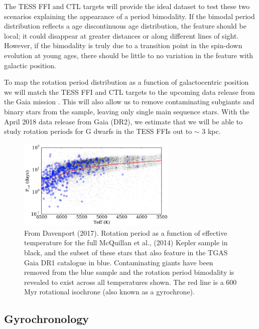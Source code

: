 \documentclass[useAMS, usenatbib, preprint, 12pt]{aastex}
\begin{document}
The TESS FFI and CTL targets will provide the ideal dataset to test these two
scenarios explaining the appearance of a period bimodality.
If the bimodal period distribution reflects a age discontinuous age
distribution, the feature should be local; it could
disappear at greater distances or along different lines of sight.
However, if the bimodality is truly due to a transition point in the spin-down
evolution at young ages, there should be little to no variation in the feature
with galactic position.

To map the rotation period distribution as a function of galactocentric
position we will match the TESS FFI and CTL targets to the upcoming data
release from the Gaia mission \citep{perryman2001}.
This will also allow us to remove contaminating subgiants and binary stars
from the sample, leaving only single main sequence stars.
With the April 2018 data release from Gaia (DR2), we estimate that we will be
able to study rotation periods for G dwarfs in the TESS FFIs out to $\sim$ 3
kpc.

\begin{figure}
\begin{center}
\includegraphics[width=3in, clip=true]{Davenport.png}
\caption{From Davenport (2017).
    Rotation period as a function of effective
temperature for the full McQuillan et al., (2014) Kepler sample in black, and
the subset of these stars that also feature in the TGAS Gaia DR1 catalogue in
blue. Contaminating giants have been removed from the blue sample and the
rotation period bimodality is revealed to exist across all temperatures shown.
    The red line is a 600 Myr rotational isochrone (also known as a gyrochrone).}
\label{fig:davenport}
\end{center}
\end{figure}

\subsection{Gyrochronology}
\end{document}
